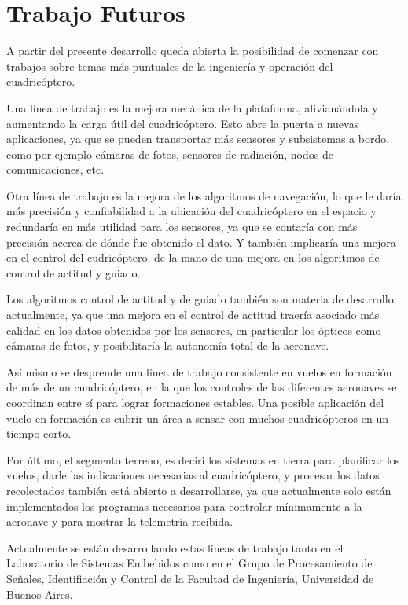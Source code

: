\documentclass[a4paper, conference]{IEEEtran}
\begin{document}
\section{Trabajo Futuros}

A partir del presente desarrollo queda abierta la posibilidad de comenzar con trabajos sobre temas más puntuales de la ingeniería y operación del cuadricóptero. 

Una línea de trabajo es la mejora mecánica de la plataforma, alivianándola y aumentando la carga útil del cuadricóptero. Esto abre la puerta a nuevas aplicaciones, ya que se pueden transportar más sensores y subsistemas a bordo, como por ejemplo cámaras de fotos, sensores de radiación, nodos de comunicaciones, etc.

Otra línea de trabajo es la mejora de los algoritmos de navegación, lo que le daría más precisión y confiabilidad a la ubicación del cuadricóptero en el espacio y redundaría en más utilidad para los sensores, ya que se contaría con más precisión acerca de dónde fue obtenido el dato. Y también implicaría una mejora en el control del cudricóptero, de la mano de una mejora en los algoritmos de control de actitud y guiado.

Los algoritmos control de actitud y de guiado también son materia de desarrollo actualmente, ya que una mejora en el control de actitud traería asociado más calidad en los datos obtenidos por los sensores, en particular los ópticos como cámaras de fotos, y posibilitaría la autonomía total de la aeronave.

Así mismo se desprende una línea de trabajo consistente en vuelos en formación de más de un cuadricóptero, en la que los controles de las diferentes aeronaves se coordinan entre sí para lograr formaciones estables. Una posible aplicación del vuelo en formación es cubrir un área a sensar con muchos cuadricópteros en un tiempo corto.

Por último, el segmento terreno, es deciri los sistemas en tierra para planificar los vuelos, darle las indicaciones necesarias al cuadricóptero, y procesar los datos recolectados también está abierto a desarrollarse, ya que actualmente solo están implementados los programas necesarios para controlar mínimamente a la aeronave y para mostrar la telemetría recibida.

Actualmente se están desarrollando estas líneas de trabajo tanto en el Laboratorio de Sistemas Embebidos como en el Grupo de Procesamiento de Señales, Identifiación y Control de la Facultad de Ingeniería, Universidad de Buenos Aires.
\end{document}
